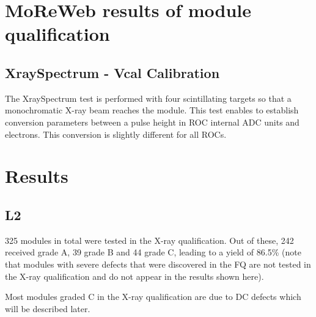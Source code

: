 \documentclass[a4paper,12pt,twoside]{article}
\begin{document}
\section{MoReWeb results of module qualification}

\subsection{XraySpectrum - Vcal Calibration}
The XraySpectrum test is performed with four scintillating targets so that a monochromatic X-ray beam reaches the module. This test enables to establish conversion parameters between a pulse height in ROC internal ADC units and electrons. This conversion is slightly different for all ROCs.

\section{Results}
\subsection{L2}
325 modules in total were tested in the X-ray qualification. Out of these, 242 received grade A, 39 grade B and 44 grade C, leading to a yield of 86.5\% (note that modules with severe defects that were discovered in the FQ are not tested in the X-ray qualification and do not appear in the results shown here). 

Most modules graded C in the X-ray qualification are due to DC defects which will be described later.
\end{document}
